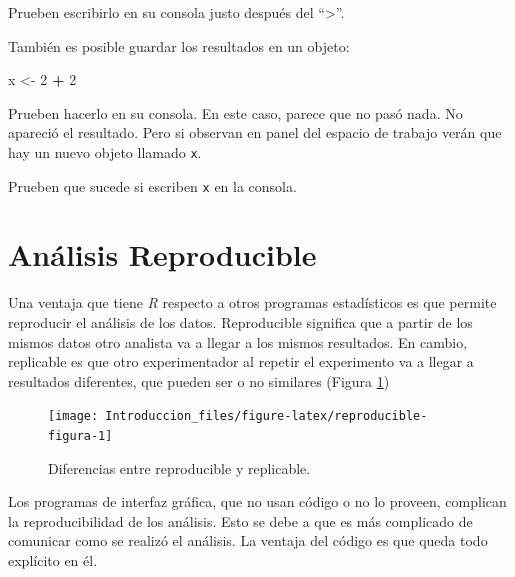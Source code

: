 \documentclass[]{book}
\newenvironment{Shaded}{\begin{snugshade}}{\end{snugshade}}
\newcommand{\DecValTok}[1]{\textcolor[rgb]{0.00,0.00,0.81}{#1}}
\newcommand{\NormalTok}[1]{#1}
\newcommand{\OperatorTok}[1]{\textcolor[rgb]{0.81,0.36,0.00}{\textbf{#1}}}
\newcommand{\StringTok}[1]{\textcolor[rgb]{0.31,0.60,0.02}{#1}}
\theoremstyle{definition}
\theoremstyle{definition}
\theoremstyle{definition}
\theoremstyle{remark}
\begin{document}
Prueben escribirlo en su consola justo después del ``\textgreater{}''.

También es posible guardar los resultados en un objeto:

\begin{Shaded}
\begin{Highlighting}[]
\NormalTok{x <-}\StringTok{ }\DecValTok{2} \OperatorTok{+}\StringTok{ }\DecValTok{2}
\end{Highlighting}
\end{Shaded}

Prueben hacerlo en su consola. En este caso, parece que no pasó nada. No
apareció el resultado. Pero si observan en panel del espacio de trabajo
verán que hay un nuevo objeto llamado \texttt{x}.

Prueben que sucede si escriben \texttt{x} en la consola.

\hypertarget{analisis-reproducible}{%
\section{Análisis Reproducible}\label{analisis-reproducible}}

Una ventaja que tiene \emph{R} respecto a otros programas estadísticos
es que permite reproducir el análisis de los datos. Reproducible
significa que a partir de los mismos datos otro analista va a llegar a
los mismos resultados. En cambio, replicable es que otro experimentador
al repetir el experimento va a llegar a resultados diferentes, que
pueden ser o no similares (Figura \ref{fig:reproducible-figura})

\begin{figure}

{\centering \texttt{[image: Introduccion\_files/figure-latex/reproducible-figura-1]} 

}

\caption{Diferencias entre reproducible y replicable.}\label{fig:reproducible-figura}
\end{figure}

Los programas de interfaz gráfica, que no usan código o no lo proveen,
complican la reproducibilidad de los análisis. Esto se debe a que es más
complicado de comunicar como se realizó el análisis. La ventaja del
código es que queda todo explícito en él.
\end{document}
